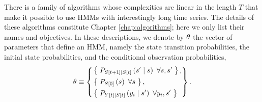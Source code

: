 There is a family of algorithms whose complexities are linear in the
length $T$ that make it possible to use HMMs with interestingly long
time series.  The details of these algorithms constitute Chapter
\ref{chap:algorithms}; here we only list their names and objectives.
In these descriptions, we denote by $\theta$ the vector of
parameters that define an HMM, namely the state transition
probabilities, the initial state probabilities, and the conditional
observation probabilities,
\begin{equation*}
   \theta \equiv \left\{
     \begin{aligned}
       &\left\{\; P_{{S}{[t+1]}\mid {S}{[t]}} \left(s'\mid s
       \right)~\forall s,s' \;\right\},\\
       & \left\{\; P_{{S}{[0]}} \left(s \right)~\forall s
       \;\right\},\\
       &  \left\{\; P_{{Y}{[t]}\mid {S}{[t]}} \left(y_i\mid s' \right)
       ~ \forall y_i,s' \;\right\}
     \end{aligned}
   \right\}.
\end{equation*}
